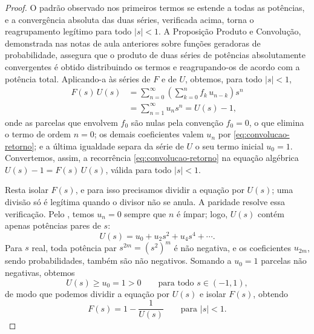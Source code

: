 \documentclass[12pt,portuguese]{article}
\theoremstyle{definition}
\theoremstyle{plainexercise}
\theoremstyle{starredexercise}
\theoremstyle{definition}
\begin{document}
\begin{proof}
O padrão observado nos primeiros termos se estende a todas as potências, e
a convergência absoluta das duas séries, verificada acima, torna o
reagrupamento legítimo para todo $|s| < 1$. A Proposição Produto e
Convolução, demonstrada nas notas de aula anteriores sobre funções
geradoras de probabilidade, assegura que o produto de duas séries de
potências absolutamente convergentes é obtido distribuindo os termos e
reagrupando-os de acordo com a potência total. Aplicando-a às séries de $F$
e de $U$, obtemos, para todo $|s| < 1$,
\begin{align*}
F(s)\,U(s)
&= \sum_{n=0}^{\infty} \left(\sum_{k=0}^{n} f_k\,u_{n-k}\right) s^n \\[0.2cm]
&= \sum_{n=1}^{\infty} u_n s^n
= U(s) - 1,
\end{align*}
onde as parcelas que envolvem $f_0$ são nulas pela convenção $f_0 = 0$, o que
elimina o termo de ordem $n = 0$; os demais coeficientes valem $u_n$ por
\eqref{eq:convolucao-retorno}; e a última igualdade separa da série de $U$ o
seu termo inicial $u_0 = 1$. Convertemos, assim, a recorrência
\eqref{eq:convolucao-retorno} na equação algébrica
$U(s) - 1 = F(s)\,U(s)$, válida para todo $|s| < 1$.

Resta isolar $F(s)$, e para isso precisamos dividir a equação por $U(s)$;
uma divisão só é legítima quando o divisor não se anula. A paridade resolve
essa verificação. Pelo , temos $u_n = 0$ sempre
que $n$ é ímpar; logo, $U(s)$ contém apenas potências pares de $s$:
\[
U(s) = u_0 + u_2 s^2 + u_4 s^4 + \cdots.
\]
Para $s$ real, toda potência par $s^{2m} = (s^2)^m$ é não negativa, e os
coeficientes $u_{2m}$, sendo probabilidades, também são não negativos.
Somando a $u_0 = 1$ parcelas não negativas, obtemos
\[
U(s) \geqslant u_0 = 1 > 0
\qquad\text{para todo } s \in (-1, 1),
\]
de modo que podemos dividir a equação por $U(s)$ e isolar $F(s)$, obtendo
\begin{equation}\label{eq:fg-relacao}
F(s) = 1 - \frac{1}{U(s)}
\qquad\text{para } |s| < 1.
\end{equation}


\end{proof}
\end{document}
